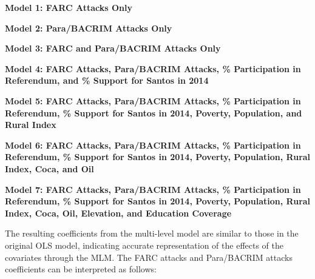 \documentclass[12pt,letterpaper]{article}
\begin{document}
	 
	
	\noindent\textbf{Model 1: FARC Attacks Only}
	
	
	
	\noindent\textbf{Model 2: Para/BACRIM Attacks Only}
	
	
	
	\noindent\textbf{Model 3: FARC and Para/BACRIM Attacks Only}
	
	
	
	\noindent\textbf{Model 4: FARC Attacks, Para/BACRIM Attacks, \% Participation in Referendum, and \% Support for Santos in 2014}
	
	
	
	\noindent\textbf{Model 5: FARC Attacks, Para/BACRIM Attacks, \% Participation in Referendum, \% Support for Santos in 2014, Poverty, Population, and Rural Index}
	
	
	
	\noindent\textbf{Model 6: FARC Attacks, Para/BACRIM Attacks, \% Participation in Referendum, \% Support for Santos in 2014, Poverty, Population, Rural Index, Coca, and Oil}
	
	
	
	\noindent\textbf{Model 7: FARC Attacks, Para/BACRIM Attacks, \% Participation in Referendum, \% Support for Santos in 2014, Poverty, Population, Rural Index, Coca, Oil, Elevation, and Education Coverage}
	
	
	
	\begin{table}
		\centering
		\caption{Multi-level Model Output}
		
		\label{tab:multilevel}
	\end{table}

	The resulting coefficients from the multi-level model are similar to those in the original OLS model, indicating accurate representation of the effects of the covariates through the MLM. The FARC attacks and Para/BACRIM attacks coefficients can be interpreted as follows:
	
\end{document}
